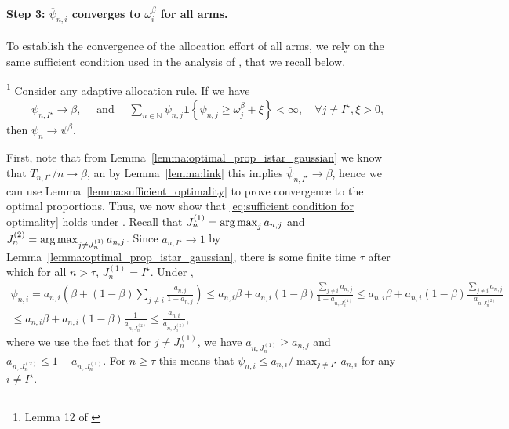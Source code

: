 \paragraph{Step 3: $\overline{\psi}_{n,i}$ converges to $\omega_i^\beta$ for all arms.} To establish the convergence of the allocation effort of all arms, we rely on the same sufficient condition used in the analysis of \cite{russo2016ttts}, that we recall below. 

\begin{lemma}\label{lemma:sufficient_optimality}\footnote{Lemma 12 of \cite{russo2016ttts}}
Consider any adaptive allocation rule. If we have
	\begin{align}\label{eq:sufficient condition for optimality}
		&\overline{\psi}_{n, I^\star} \rightarrow \beta, \quad \text{ and } \quad
		\sum_{n \in \mathbb{N}} \psi_{n,j} \bm{1} \left\lbrace \overline{\psi}_{n,j} \geq \omega_j^\beta + \xi \right\rbrace < \infty, \quad \forall j \neq I^\star, \xi > 0,
	\end{align}
then $\overline{\psi}_{n} \rightarrow \psi^\beta$.
\end{lemma}

First, note that from Lemma~\ref{lemma:optimal_prop_istar_gaussian} we know that $T_{n,I^\star}/n \rightarrow \beta$, an by Lemma~\ref{lemma:link} this implies $\overline{\psi}_{n, I^\star} \rightarrow \beta$, hence we can use Lemma~\ref{lemma:sufficient_optimality} to prove convergence to the optimal proportions. Thus, we now show that \eqref{eq:sufficient condition for optimality} holds under \TTTS. Recall that $J_n^{(1)} = \operatorname*{arg\,max}_{j} a_{n,j}$ and $J_n^{(2)} = \operatorname*{arg\,max}_{j\neq J_n^{(1)}} a_{n,j}$. Since $a_{n,I^\star} \rightarrow 1$ by Lemma~\ref{lemma:optimal_prop_istar_gaussian}, there is some finite time $\tau$ after which for all $n > \tau$, $J_n^{(1)} = I^\star$. Under \TTTS, 
	\begin{align*}
	\psi_{n,i} =a_{n,i} \left( \beta  + (1-\beta) \sum_{j \neq i} \frac{a_{n,j}}{1-a_{n,j}} \right)
	           \leq a_{n,i} \beta  + a_{n,i} (1-\beta) \frac{\sum_{j \neq i} a_{n,j}}{1-a_{n,J_n^{(1)}}}
	           \leq  a_{n,i} \beta + a_{n,i} (1-\beta) \frac{\sum_{j \neq i} a_{n,j}}{a_{n,J_n^{(2)}}}\\
	           \leq a_{n,i}\beta  + a_{n,i} (1-\beta) \frac{1}{a_{n,J_n^{(2)}}}
	           \leq \frac{a_{n,i}}{a_{n,J_n^{(2)}}},
	\end{align*}
where we use the fact that for $j \neq J_n^{(1)}$, we have $a_{n,J_n^{(1)}} \geq a_{n,j}$ and $a_{n,J_n^{(2)}} \leq 1- a_{n,J_n^{(1)}}$. For $n \geq \tau$ this means that $\psi_{n, i} \leq a_{n,i} / \max_{j \neq I^\star} a_{n,i}$ for any $i \neq I^\star$.
	
